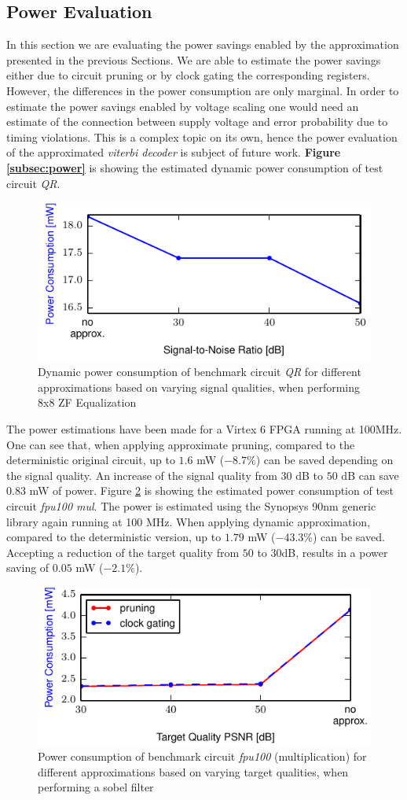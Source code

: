 \documentclass[10pt,twocolumn]{IEEEtran} %
\begin{document}
\subsection{\bf{Power Evaluation}}
In this section we are evaluating the power savings enabled by the approximation presented in the previous Sections. We are able to estimate the power savings either due to circuit pruning or by clock gating the corresponding registers. However, the differences in the power consumption are only marginal. In order to estimate the power savings enabled by voltage scaling one would need an estimate of the connection between supply voltage and error probability due to timing violations. This is a complex topic on its own, hence the power evaluation of the approximated \emph{viterbi decoder} is subject of future work. {\bf Figure \ref{subsec:power}} is showing the estimated dynamic power consumption of test circuit \emph{QR}. 
\label{subsec:power}
\begin{figure}[htb]
  \centering
  \includegraphics[width=.48\textwidth]{figs/power_qr}
  \caption{Dynamic power consumption of benchmark circuit \emph{QR} for different approximations based on varying signal qualities, when performing 8x8 ZF Equalization}
  \label{fig:power_qr}
\end{figure}
The power estimations have been made for a Virtex 6 FPGA running at 100MHz. One can see that, when applying approximate pruning, compared to the deterministic original circuit, up to $1.6$ mW ($-8.7\%$) can be saved depending on the signal quality. An increase of the signal quality from $30$ dB to $50$ dB can save $0.83$ mW of power.
Figure \ref{fig:power_fpu} is showing the estimated power consumption of test circuit \emph{fpu100 mul}. The power is estimated using the Synopsys 90nm generic library again running at 100 MHz. When applying dynamic approximation, compared to the deterministic version, up to $1.79$ mW ($-43.3\%$) can be saved. Accepting a reduction of the target quality from $50$ to $30$dB, results in a power saving of $0.05$ mW ($-2.1\%$).
\begin{figure}[htb]
  \centering
  \includegraphics[width=.48\textwidth]{figs/power_fpu}
  \caption{Power consumption of benchmark circuit \emph{fpu100} (multiplication) for different approximations based on varying target qualities, when performing a sobel filter}
  \label{fig:power_fpu}
\end{figure}
\end{document}
